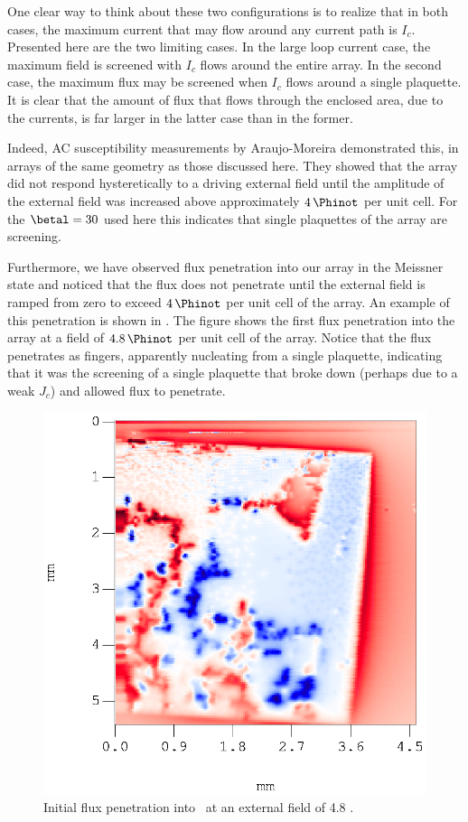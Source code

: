 One clear way to think about these two configurations is to realize 
that in both cases, the maximum current that may flow around any 
current path is $I_c$. Presented here are the two limiting cases. 
In the large loop current case, the maximum field is screened with
$I_c$ flows around the entire array. In the second case, the maximum
flux may be screened when $I_c$ flows around a single plaquette. 
It is clear that the amount of flux that flows through the enclosed
area, due to the currents, is far larger in the latter case than
in the former. 

Indeed, 
AC susceptibility measurements by Araujo-Moreira \etal
\cite{araujo_prl_78_4625_1997} demonstrated this, in arrays of the 
same geometry as those discussed here. They showed that 
the array did not respond hysteretically to a driving external field
until the amplitude of the external field was increased above approximately
$4\,\Phinot$ per unit cell. For the $\betal =30 $ used here this
indicates that single
plaquettes of the array are screening.  

Furthermore, we have observed flux penetration into our array in the
Meissner state and noticed that the flux does not penetrate until the
external field is ramped from zero to exceed $4\,\Phinot$ per unit cell
of the array. An example of this penetration is shown in 
. The figure shows the first
flux penetration into the array at a field of $4.8\,\Phinot$ per unit cell 
of the array. Notice that the flux penetrates as fingers, apparently
nucleating from a single plaquette, indicating that it was the screening
of a single plaquette that broke down (perhaps due to a weak $J_c$) 
and allowed flux to penetrate. 

\begin{figure}
\includegraphics[clip=true]{figs/pme_theory/fig42.eps}
\caption[Initial flux penetration into \jja]{Initial flux 
penetration into \jja\ at an external field of 4.8 \Phinot.}
\label{fig:init_flux_penetration}
\end{figure}

